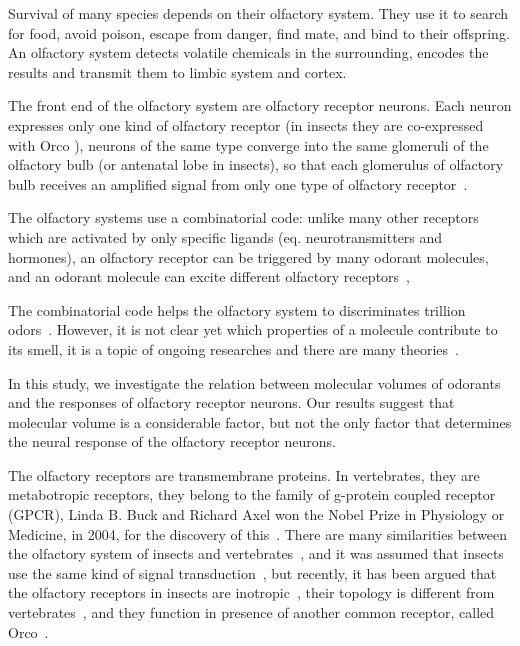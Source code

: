 \documentclass[11pt]{article} %
\begin{document}
Survival of many species depends on their olfactory system. 
They use it  to search for food, 
avoid poison, 
escape from danger, 
find mate, 
and bind to their offspring.
An olfactory system detects volatile chemicals in the surrounding, 
encodes the results and transmit them to limbic system and cortex.

The front end of the olfactory system are olfactory receptor neurons.  
Each neuron expresses only one kind of olfactory receptor (in insects they are co-expressed with Orco \cite{Larsson2004}),
neurons of the same type converge into the same glomeruli of the olfactory bulb (or antenatal lobe in insects),
so that each glomerulus of olfactory bulb receives an amplified signal from only one type of olfactory receptor~\cite{root2007,Carey2011,Vosshall2000,Couto2005,fishilevich2005,gao2000,wang1998,mombaerts1996,vassar1994}.

The olfactory systems use a combinatorial code: 
unlike many other receptors which are activated by only specific ligands (eq. neurotransmitters and hormones),
an olfactory receptor can be triggered by many odorant molecules, 
and an odorant molecule can excite different olfactory receptors~\cite{Malnic2000},

The combinatorial code helps the olfactory system to discriminates trillion odors~\cite{Bushdid2014}.
However, it is not clear yet which properties of a molecule contribute to its smell,
it is a topic of ongoing researches and there are many theories~\cite{Turin,Keller2004,Araneda2000,Brookes2007,Franco2011,Pelz2006,Gabler2013,Schmuker2007,Haddad2008,Snitz2013,Yablonka2012,gane2013}.

In this study, 
we investigate the relation between molecular volumes of odorants and the responses of olfactory receptor neurons. 
Our results suggest that molecular volume is a considerable factor, 
but not the only factor that determines the neural response of the olfactory receptor neurons.

The olfactory receptors are transmembrane proteins.
In vertebrates, they are metabotropic receptors, they belong to the family of g-protein coupled receptor (GPCR), 
Linda B. Buck and Richard Axel won the Nobel Prize in Physiology or Medicine, in 2004, 
for the discovery of this~\cite{Buck1991}.
There are many similarities between the olfactory system of insects and vertebrates~\cite{Wilson2014,Kaupp2010}, 
and it was assumed that insects use the same kind of signal transduction~\cite{Brody2000,Hill04102002}, 
but recently, it has been argued that the olfactory receptors in insects are inotropic~\cite{Sato2008,Wicher2008,Nagel2011,Rong2011}, 	
their topology is different from vertebrates~\cite{Benton2007,Smart2008},
and they function in presence of another common receptor, called Orco~\cite{Larsson2004}.
\end{document}
